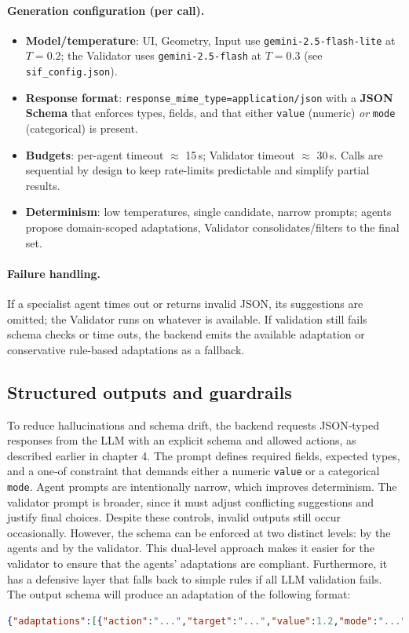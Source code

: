 \documentclass[openany]{book}
\begin{document}
\paragraph{Generation configuration (per call).}
\begin{itemize}
  \item \textbf{Model/temperature}: UI, Geometry, Input use \texttt{gemini-2.5-flash-lite} at $T{=}0.2$; the Validator uses \texttt{gemini-2.5-flash} at $T{=}0.3$ (see \texttt{sif\_config.json}).
  \item \textbf{Response format}: \texttt{response\_mime\_type=application/json} with a \textbf{JSON Schema} that enforces types, fields, and that either \texttt{value} (numeric) \emph{or} \texttt{mode} (categorical) is present.
  \item \textbf{Budgets}: per-agent timeout $\approx$ 15\,s; Validator timeout $\approx$ 30\,s. Calls are sequential by design to keep rate-limits predictable and simplify partial results.
  \item \textbf{Determinism}: low temperatures, single candidate, narrow prompts; agents propose domain-scoped adaptations, Validator consolidates/filters to the final set.
\end{itemize}

\paragraph{Failure handling.}
If a specialist agent times out or returns invalid JSON, its suggestions are omitted; the Validator runs on whatever is available. If validation still fails schema checks or time outs, the backend emits the available adaptation or conservative rule-based adaptations as a fallback.

\subsection{Structured outputs and guardrails}
To reduce hallucinations and schema drift, the backend requests JSON‑typed responses from the LLM with an explicit schema and allowed actions, as described earlier in chapter 4. The prompt defines required fields, expected types, and a one‑of constraint that demands either a numeric \texttt{value} or a categorical \texttt{mode}. Agent prompts are intentionally narrow, which improves determinism. The validator prompt is broader, since it must adjust conflicting suggestions and justify final choices. Despite these controls, invalid outputs still occur occasionally. However, the schema can be enforced at two distinct levels: by the agents and by the validator. This dual-level approach makes it easier for the validator to ensure that the agents' adaptations are compliant. Furthermore, it has a defensive layer that falls back to simple rules if all LLM validation fails.
The output schema will produce an adaptation of the following format:
\begin{lstlisting}[language=json,basicstyle=\ttfamily\small,caption={Example adaptation Format}]
{"adaptations":[{"action":"...","target":"...","value":1.2,"mode":"...","reason":"...","intent":"..."}]}
\end{lstlisting}
\end{document}
